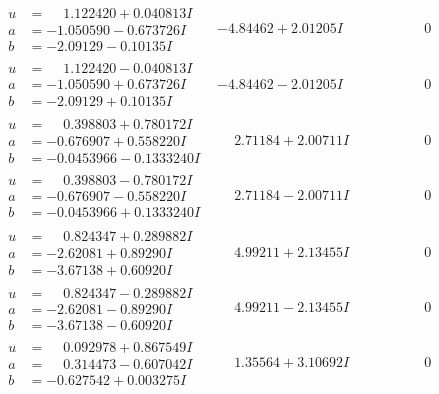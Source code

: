 \documentclass[1p]{elsarticle_modified}
\theoremstyle{definition}
\begin{document}
$$\begin{array}{c|c|c}
\begin{aligned}
u &= \phantom{-}1.122420 + 0.040813 I \\
a &= -1.050590 - 0.673726 I \\
b &= -2.09129 - 0.10135 I\end{aligned}
 & -4.84462 + 2.01205 I & \phantom{-0.000000 } 0 \\ \hline\begin{aligned}
u &= \phantom{-}1.122420 - 0.040813 I \\
a &= -1.050590 + 0.673726 I \\
b &= -2.09129 + 0.10135 I\end{aligned}
 & -4.84462 - 2.01205 I & \phantom{-0.000000 } 0 \\ \hline\begin{aligned}
u &= \phantom{-}0.398803 + 0.780172 I \\
a &= -0.676907 + 0.558220 I \\
b &= -0.0453966 - 0.1333240 I\end{aligned}
 & \phantom{-}2.71184 + 2.00711 I & \phantom{-0.000000 } 0 \\ \hline\begin{aligned}
u &= \phantom{-}0.398803 - 0.780172 I \\
a &= -0.676907 - 0.558220 I \\
b &= -0.0453966 + 0.1333240 I\end{aligned}
 & \phantom{-}2.71184 - 2.00711 I & \phantom{-0.000000 } 0 \\ \hline\begin{aligned}
u &= \phantom{-}0.824347 + 0.289882 I \\
a &= -2.62081 + 0.89290 I \\
b &= -3.67138 + 0.60920 I\end{aligned}
 & \phantom{-}4.99211 + 2.13455 I & \phantom{-0.000000 } 0 \\ \hline\begin{aligned}
u &= \phantom{-}0.824347 - 0.289882 I \\
a &= -2.62081 - 0.89290 I \\
b &= -3.67138 - 0.60920 I\end{aligned}
 & \phantom{-}4.99211 - 2.13455 I & \phantom{-0.000000 } 0 \\ \hline\begin{aligned}
u &= \phantom{-}0.092978 + 0.867549 I \\
a &= \phantom{-}0.314473 - 0.607042 I \\
b &= -0.627542 + 0.003275 I\end{aligned}
 & \phantom{-}1.35564 + 3.10692 I & \phantom{-0.000000 } 0\\

\end{array}$$
\end{document}
